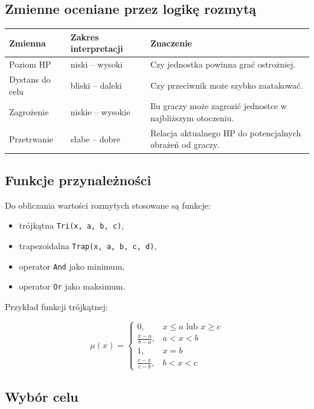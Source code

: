 \documentclass[12pt,a4paper]{article}
\begin{document}
\subsection{Zmienne oceniane przez logikę rozmytą}

\begin{longtable}{p{4cm} p{4cm} p{6cm}}
\toprule
\textbf{Zmienna} & \textbf{Zakres interpretacji} & \textbf{Znaczenie} \\
\midrule
\endhead
Poziom HP & niski -- wysoki & Czy jednostka powinna grać ostrożniej. \\[4pt]
Dystans do celu & bliski -- daleki & Czy przeciwnik może szybko zaatakować. \\[4pt]
Zagrożenie & niskie -- wysokie & Ilu graczy może zagrozić jednostce w najbliższym otoczeniu. \\[4pt]
Przetrwanie & słabe -- dobre & Relacja aktualnego HP do potencjalnych obrażeń od graczy. \\
\bottomrule
\end{longtable}

\subsection{Funkcje przynależności}

Do obliczania wartości rozmytych stosowane są funkcje:

\begin{itemize}
    \item trójkątna \texttt{Tri(x, a, b, c)},
    \item trapezoidalna \texttt{Trap(x, a, b, c, d)},
    \item operator \texttt{And} jako minimum,
    \item operator \texttt{Or} jako maksimum.
\end{itemize}

Przykład funkcji trójkątnej:

\begin{equation}
\mu(x)=
\begin{cases}
0, & x \leq a \text{ lub } x \geq c \\
\frac{x-a}{b-a}, & a < x < b \\
1, & x=b \\
\frac{c-x}{c-b}, & b < x < c
\end{cases}
\end{equation}

\subsection{Wybór celu}
\end{document}
